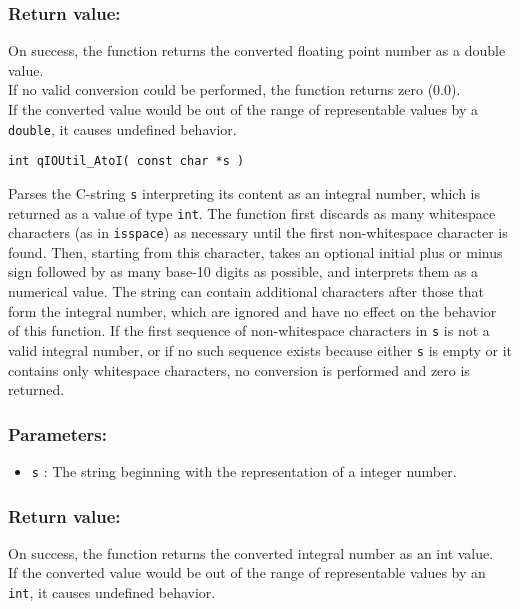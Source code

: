 \subsubsection*{Return value:}
On success, the function returns the converted floating point number as  a double value. \\
If no valid conversion could be performed, the function returns zero (0.0). \\
If the converted value would be out of the range of representable values by a \lstinline{double}, it causes undefined behavior.


\noindent\hrulefill

\begin{lstlisting}[style=CStyle]
int qIOUtil_AtoI( const char *s )
\end{lstlisting}

Parses the C-string \lstinline{s} interpreting its content as an integral number, which is returned as a value of type \lstinline{int}. The function first discards as many whitespace characters (as in \lstinline{isspace}) as necessary until the first non-whitespace character is found. Then, starting from this character, takes an optional initial plus or minus sign followed by as many base-10 digits as possible, and interprets them as a numerical value. 
The string can contain additional characters after those that form the integral number, which are ignored and have no effect on the behavior of this function. If the first sequence of non-whitespace characters in \lstinline{s} is not a valid integral number, or if no such sequence exists because either \lstinline{s} is empty or it contains only whitespace characters, no conversion is performed and zero is returned.

\subsubsection*{Parameters:}
\begin{itemize}
    \item \lstinline{s} : The string beginning with the representation of a integer number.

\end{itemize}

\subsubsection*{Return value:}
On success, the function returns the converted integral number as an int value. \\
If the converted value would be out of the range of representable values by an \lstinline{int}, it causes undefined behavior.


